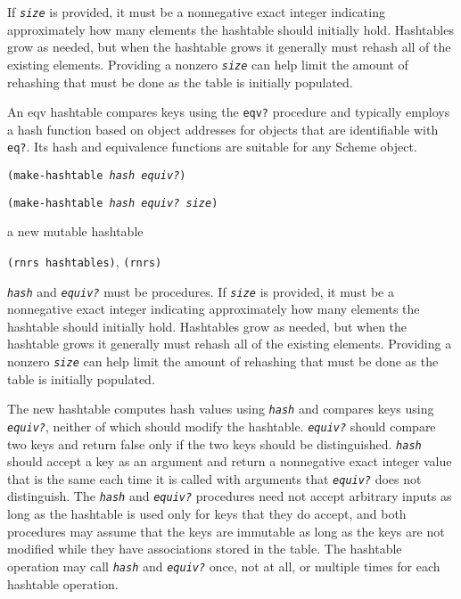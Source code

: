 If \texttt{\textit{size}} is provided, it must be a nonnegative exact integer
indicating approximately how many elements the hashtable should
initially hold.
Hashtables grow as needed, but when the hashtable grows it generally must
rehash all of the existing elements.
Providing a nonzero \texttt{\textit{size}} can help limit the amount of rehashing
that must be done as the table is initially populated.


An eqv hashtable compares keys using the \texttt{eqv?}
procedure and typically employs a hash function based on object addresses
for objects that are identifiable with \texttt{eq?}.
Its hash and equivalence functions are suitable for any Scheme object.


\begin{description}

\label{objects_s276}\item[procedure] \texttt{(make-hashtable \textit{hash} \textit{equiv?})}



\item[procedure] \texttt{(make-hashtable \textit{hash} \textit{equiv?} \textit{size})}



\item[returns] a new mutable hashtable


\item[libraries] \texttt{(rnrs hashtables)}, \texttt{(rnrs)}
\end{description}

\texttt{\textit{hash}} and \texttt{\textit{equiv?}} must be procedures.
If \texttt{\textit{size}} is provided, it must be a nonnegative exact integer
indicating approximately how many elements the hashtable should
initially hold.
Hashtables grow as needed, but when the hashtable grows it generally must
rehash all of the existing elements.
Providing a nonzero \texttt{\textit{size}} can help limit the amount of rehashing
that must be done as the table is initially populated.

The new hashtable computes hash values using \texttt{\textit{hash}} and
compares keys using \texttt{\textit{equiv?}}, neither of which should modify the
hashtable.
\texttt{\textit{equiv?}} should compare two keys and return false only if the two keys
should be distinguished.
\texttt{\textit{hash}} should accept a key as an argument and return a nonnegative
exact integer value that is the same each time it is called with arguments
that \texttt{\textit{equiv?}} does not distinguish.
The \texttt{\textit{hash}} and \texttt{\textit{equiv?}} procedures need not accept arbitrary inputs
as long as the hashtable is used only for keys that they do accept,
and both procedures may assume that the keys are immutable as long
as the keys are not modified while they have associations stored in the table.
The hashtable operation may call \texttt{\textit{hash}} and \texttt{\textit{equiv?}} once,
not at all, or multiple times for each hashtable operation.


